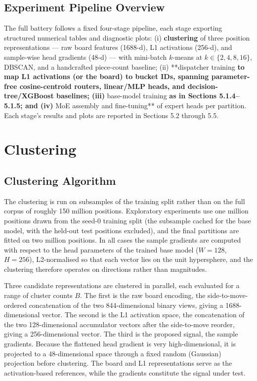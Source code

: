 \subsection{Experiment Pipeline Overview}

The full battery follows a fixed four-stage pipeline, each stage exporting structured numerical tables and diagnostic plots: (i) \textbf{clustering} of three position representations --- raw board features (1688-d), L1 activations (256-d), and sample-wise head gradients (48-d) --- with mini-batch $k$-means at $k \in \{2,4,8,16\}$, DBSCAN, and a handcrafted piece-count baseline; (ii) **dispatcher
training\textbf{ to map L1 activations (or the board) to bucket IDs, spanning parameter-free cosine-centroid routers, linear/MLP heads, and decision-tree/XGBoost baselines; (iii) }base-model training\textbf{ as in Sections 5.1.4--5.1.5; and (iv) }MoE assembly and fine-tuning** of expert heads per partition. Each stage's results and plots are reported in Sections 5.2 through 5.5.


\section{Clustering}

\subsection{Clustering Algorithm}

The clustering is run on subsamples of the training split rather than on the full corpus of roughly 150 million positions. Exploratory experiments use one million positions drawn from the seed-0 training split (the subsample cached for the base model, with the held-out test positions excluded), and the final partitions are fitted on two million positions. In all cases the sample gradients are computed with respect to the head parameters of the trained base model ($W=128$, $H=256$), L2-normalised so that each vector lies on the unit hypersphere, and the clustering therefore operates on directions rather than magnitudes.

Three candidate representations are clustered in parallel, each evaluated for a range of cluster counts $B$. The first is the raw board encoding, the side-to-move-ordered concatenation of the two 844-dimensional binary views, giving a 1688-dimensional vector. The second is the L1 activation space, the concatenation of the two 128-dimensional accumulator vectors after the side-to-move reorder, giving a 256-dimensional vector. The third is the proposed signal, the sample gradients. Because the flattened head gradient is very high-dimensional, it is projected to a 48-dimensional space through a fixed random (Gaussian) projection before clustering. The board and L1 representations serve as the activation-based references, while the gradients constitute the signal under test.

